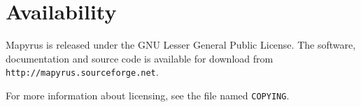 
\section{Availability}

Mapyrus is released under the GNU Lesser General Public License.
The software, documentation and source code is available for download
from \\
\texttt{http://mapyrus.sourceforge.net}.

For more information about licensing, see the file named \texttt{COPYING}.

